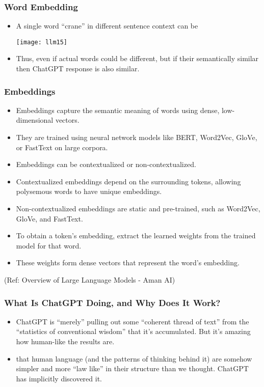 \begin{frame}[fragile]\frametitle{Word Embedding}

\begin{itemize}

\item A single word ``crane'' in different sentence context can be 

\begin{center}
\texttt{[image: llm15]}
\end{center}

\item Thus, even if actual words could be different, but if their semantically similar then ChatGPT response is also similar.
\end{itemize}

\end{frame}

\begin{frame}[fragile]\frametitle{Embeddings}


\begin{itemize}
\item Embeddings capture the semantic meaning of words using dense, low-dimensional vectors.
\item They are trained using neural network models like BERT, Word2Vec, GloVe, or FastText on large corpora.
\item Embeddings can be contextualized or non-contextualized.
\item Contextualized embeddings depend on the surrounding tokens, allowing polysemous words to have unique embeddings.
\item Non-contextualized embeddings are static and pre-trained, such as Word2Vec, GloVe, and FastText.
\item To obtain a token's embedding, extract the learned weights from the trained model for that word.
\item These weights form dense vectors that represent the word's embedding.
\end{itemize}

				
{\tiny (Ref: Overview of Large Language Models - Aman AI)}

\end{frame}


\begin{frame}[fragile]\frametitle{What Is ChatGPT Doing, and Why Does It Work?}

\begin{itemize}
\item ChatGPT is “merely” pulling out some “coherent thread of text” from the “statistics of conventional wisdom” that it’s accumulated. But it’s amazing how human-like the results are.
\item that human language (and the patterns of thinking behind it) are somehow simpler and more “law like” in their structure than we thought. ChatGPT has implicitly discovered it.
\end{itemize}

\end{frame}

